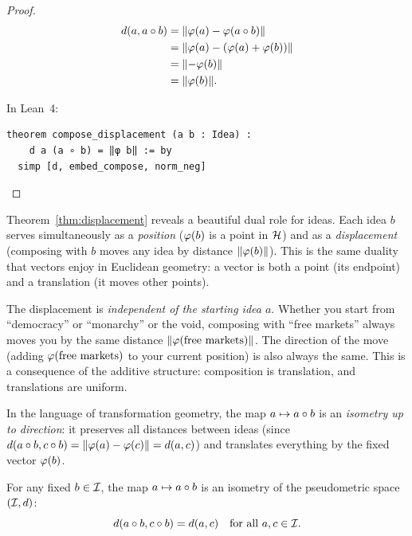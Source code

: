 \begin{proof}
\begin{align*}
  d(a, a \circ b)
  &= \lVert \varphi(a) - \varphi(a \circ b) \rVert \\
  &= \lVert \varphi(a) - (\varphi(a) + \varphi(b)) \rVert \\
  &= \lVert -\varphi(b) \rVert \\
  &= \lVert \varphi(b) \rVert.
\end{align*}

In Lean~4:
\begin{lstlisting}
theorem compose_displacement (a b : Idea) :
    d a (a ∘ b) = ‖φ b‖ := by
  simp [d, embed_compose, norm_neg]
\end{lstlisting}
\end{proof}

\begin{interpretation}
\label{interp:displacement}
Theorem~\ref{thm:displacement} reveals a beautiful dual role for ideas.
Each idea $b$ serves simultaneously as a \emph{position} ($\varphi(b)$ is a
point in $\mathcal{H}$) and as a \emph{displacement} (composing with $b$ moves
any idea by distance $\lVert \varphi(b) \rVert$). This is the same duality that vectors
enjoy in Euclidean geometry: a vector is both a point (its endpoint) and a
translation (it moves other points).

The displacement is \emph{independent of the starting idea $a$}. Whether you
start from ``democracy'' or ``monarchy'' or the void, composing with ``free
markets'' always moves you by the same distance $\lVert \varphi(\text{free
markets}) \rVert$. The direction of the move (adding $\varphi(\text{free markets})$
to your current position) is also always the same. This is a consequence of
the additive structure: composition is translation, and translations are
uniform.

In the language of transformation geometry, the map $a \mapsto a \circ b$ is
an \emph{isometry up to direction}: it preserves all distances between ideas
(since $d(a \circ b, c \circ b) = \lVert \varphi(a) - \varphi(c) \rVert = d(a, c)$)
and translates everything by the fixed vector $\varphi(b)$.
\end{interpretation}

\begin{proposition}
\label{prop:right-isometry}
For any fixed $b \in \mathcal{I}$, the map $a \mapsto a \circ b$ is an isometry of
the pseudometric space $(\mathcal{I}, d)$:
\[
  d(a \circ b, c \circ b) = d(a, c) \quad \text{for all } a, c \in \mathcal{I}.
\]
\end{proposition}

